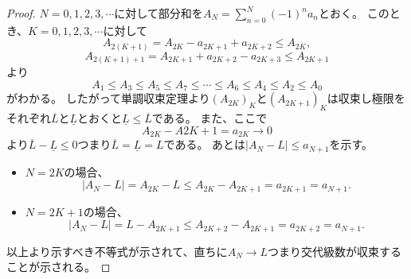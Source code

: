 \begin{proof}
$N = 0, 1, 2, 3, \cdots$に対して部分和を$A_N = \sum_{n = 0}^N (-1)^n a_n$とおく。
このとき、$K = 0, 1, 2, 3, \cdots$に対して
$$
A_{2(K+1)} = A_{2 K}-a_{2 K+1}+a_{2 K+2} \le A_{2 K},
$$
$$
A_{2(K+1)+1} = A_{2 K+1}+a_{2 K+2}-a_{2 K+3} \le A_{2 K+1}
$$
より
$$
A_1 \le A_3 \le A_5 \le A_7 \le \cdots \le A_6 \le A_4 \le A_2 \le A_0
$$
がわかる。
したがって単調収束定理より$(A_{2 K})_K$と$(A_{2 K+1})_K$は収束し極限をそれぞれ$\overline{L}$と$\underline{L}$とおくと$\underline{L} \le \overline{L}$である。
また、ここで
$$
A_{2 K}-A{2 K+1} = a_{2 K} \to 0
$$
より$\overline{L}-\underline{L} \le 0$つまり$\overline{L} = \underline{L} = L$である。
あとは$|A_N-L| \le a_{N+1}$を示す。
\begin{itemize}
\item
$N = 2 K$の場合、
$$
|A_N-L| = A_{2 K}-L \le A_{2 K}-A_{2 K+1} = a_{2 K+1} = a_{N+1}.
$$
\item
$N = 2 K+1$の場合、
$$
|A_N-L| = L-A_{2 K+1} \le A_{2 K+2}-A_{2 K+1} = a_{2 K+2} = a_{N+1}.
$$
\end{itemize}
以上より示すべき不等式が示されて、直ちに$A_N \to L$つまり交代級数が収束することが示される。
\end{proof}
